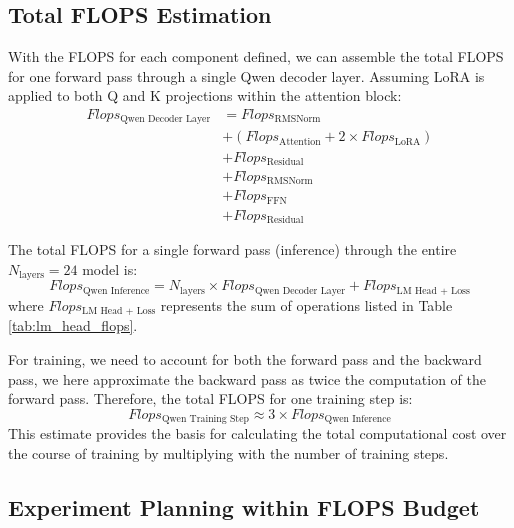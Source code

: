 \documentclass{article}
\begin{document}
\subsection{Total FLOPS Estimation}

With the FLOPS for each component defined, we can assemble the total FLOPS for one forward pass through a single Qwen decoder layer. Assuming LoRA is applied to both Q and K projections within the attention block:
\begin{align}
Flops_{\text{Qwen Decoder Layer}} &=  Flops_{\text{RMSNorm}} \nonumber \\
                                 &+ (Flops_{\text{Attention}} + 2 \times Flops_{\text{LoRA}} ) \nonumber \\ 
                                 &+ Flops_{\text{Residual}} \nonumber \\
                                 &+Flops_{\text{RMSNorm}} \nonumber\\
                                 &+ Flops_{\text{FFN}} \nonumber \\
                                 &+ Flops_{\text{Residual}} \label{eq:qwen_layer_flops}
\end{align}


The total FLOPS for a single forward pass (inference) through the entire $N_{\text{layers}}=24$ model is:
\begin{equation}
Flops_{\text{Qwen Inference}} = N_{\text{layers}} \times Flops_{\text{Qwen Decoder Layer}} + Flops_{\text{LM Head + Loss}}
\label{eq:qwen_inference_flops}
\end{equation}
where $Flops_{\text{LM Head + Loss}}$ represents the sum of operations listed in Table \ref{tab:lm_head_flops}.

For training, we need to account for both the forward pass and the backward pass, we here approximate the backward pass as twice the computation of the forward pass. Therefore, the total FLOPS for one training step is:
\begin{equation}
Flops_{\text{Qwen Training Step}} \approx 3 \times Flops_{\text{Qwen Inference}}
\label{eq:qwen_training_flops}
\end{equation}
This estimate provides the basis for calculating the total computational cost over the course of training by multiplying with the number of training steps.


\subsection{Experiment Planning within FLOPS Budget}
\end{document}
